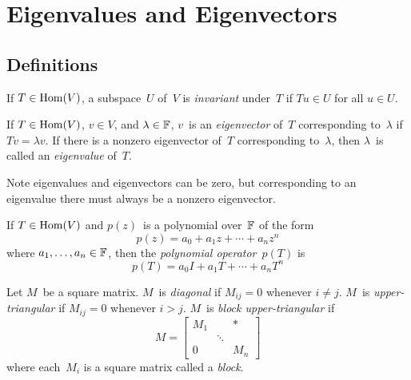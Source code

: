 %
%
%
\section{Eigenvalues and Eigenvectors}
\subsection*{Definitions}
\begin{defn}
If \(T\in\operatorname{Hom}(V)\), a subspace~\(U\) of~\(V\) is \emph{invariant} under~\(T\) if \(Tu\in U\) for all \(u\in U\).
\end{defn}

\begin{defn}
If \(T\in\operatorname{Hom}(V)\), \(v\in V\), and \(\lambda\in\mathbb{F}\), \(v\)~is an \emph{eigenvector} of~\(T\) corresponding to~\(\lambda\) if \(Tv=\lambda v\). If there is a nonzero eigenvector of~\(T\) corresponding to~\(\lambda\), then \(\lambda\)~is called an \emph{eigenvalue} of~\(T\).
\end{defn}
\begin{rmk}
Note eigenvalues and eigenvectors can be zero, but corresponding to an eigenvalue there must always be a nonzero eigenvector.
\end{rmk}

\begin{defn}
If \(T\in\operatorname{Hom}(V)\) and \(p(z)\)~is a polynomial over~\(\mathbb{F}\) of the form
\[p(z)=a_0+a_1z+\cdots+a_nz^n\]
where \(a_1,\ldots,a_n\in\mathbb{F}\), then the \emph{polynomial operator}~\(p(T)\) is
\[p(T)=a_0I+a_1T+\cdots+a_nT^n\]
\end{defn}

\begin{defn}
Let \(M\)~be a square matrix. \(M\)~is \emph{diagonal} if \(M_{ij}=0\) whenever \(i\ne j\). \(M\)~is \emph{upper-triangular} if \(M_{ij}=0\) whenever \(i>j\). \(M\)~is \emph{block upper-triangular} if
\[M=\left[\begin{matrix}
M_1&&*\\
&\ddots&\\
0&&M_n
\end{matrix}\right]\]
where each~\(M_i\) is a square matrix called a \emph{block}.
\end{defn}


